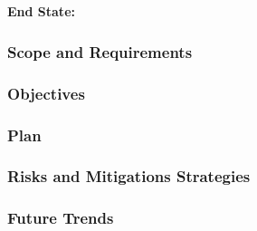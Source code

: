 \subsection{ \nnsa}\label{subsect:nnsa}

\textbf{End State:} 

\subsubsection{Scope and Requirements}
\subsubsection{Objectives}
\subsubsection{Plan}
\subsubsection{Risks and Mitigations Strategies}
\subsubsection{Future Trends}
